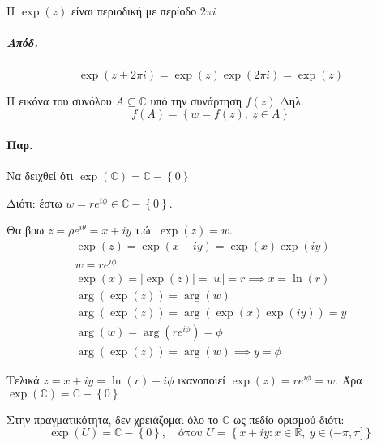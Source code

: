 \documentclass[12pt,a4paper,notitlepage,fleqn]{article}
\begin{document}
\begin{enumparen}{}
    	\paragraph{}
    	\begin{theorem*}{}
    		Η \( \exp(z) \) είναι περιοδική με περίοδο \( 2\pi i \)
    	\end{theorem*}
    	\subparagraph{Απόδ.}
    	\[
    	\exp(z+2\pi i) = \exp(z)\exp(2\pi i) = \exp(z)
    	\]

    	Η εικόνα του συνόλου \( A \subseteq \mathbb C  \) υπό την συνάρτηση \( f(z) \)
    	Δηλ.
    	\[ f(A)=\left\lbrace w=f(z),\ z\in A \right\rbrace \]
    	\paragraph{Παρ.} Να δειχθεί ότι \( \exp(\mathbb C ) =
    	\mathbb C -\left\lbrace 0 \right\rbrace \)

    	Διότι: έστω \( w=re^{i\phi}\in\mathbb C -\left\lbrace 0 \right\rbrace \).

    	Θα βρω \( z=\rho e^{i\theta}=x+iy \) τ.ώ: \( \exp(z)=w \).
    	\begin{gather*}
    	\exp(z)=\exp(x+iy) = \exp(x)\exp(iy) \\
    	w=re^{i\phi} \\
    	\exp(x) = \left|\exp(z)\right|=|w|=r \implies \boxed{x = \ln(r)} \\[.5pt]
    	\arg\left( \exp(z) \right) = \arg(w) \\
    	\arg\left(\exp(z)\right) = \arg\left(\exp(x)\exp(iy)\right) = y \\
    	\arg(w)=\arg(re^{i\phi}) = \phi \\
        \arg\left(\exp(z)\right)=\arg(w) \implies \boxed{y=\phi}
    	\end{gather*}

    	Τελικά \( z=x+iy = \ln(r)+i\phi \) ικανοποιεί \( \exp(z)=re^{i\phi}=w \).
    	Άρα \( \exp(\mathbb C)=\mathbb C-\left\lbrace 0 \right\rbrace \)

    	Στην πραγματικότητα, δεν χρειάζομαι όλο το \( \mathbb C \) ως πεδίο ορισμού διότι:
    	\[
    	\exp(U) = \mathbb C-\left\lbrace 0 \right\rbrace,\quad
    	\text{όπου } U = \left\lbrace
    	    x+iy:x\in\mathbb R,\ y\in(-\pi,\pi]
    	 \right\rbrace
    	\]

\end{enumparen}
\end{document}
